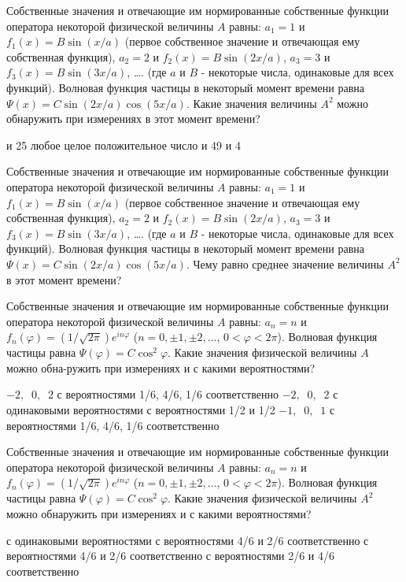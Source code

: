 \documentclass[11pt,a4paper]{exam}
\begin{document}
\begin{questions}
\question Собственные значения и отвечающие им нормированные собственные функции оператора некоторой физической величины $A$ равны: ${a_1} = 1$ и ${f_1}(x) = B\sin (x/a)$ (первое собственное значение и отвечающая ему собственная функция), ${a_2} = 2$ и ${f_2}(x) = B\sin (2x/a)$, ${a_3} = 3$ и ${f_3}(x) = B\sin (3x/a)$, …. (где $a$ и $B$ - некоторые числа, одинаковые для всех функций). Волновая функция частицы в некоторый момент времени равна $\Psi (x) = C\sin (2x/a)\cos (5x/a)$. Какие значения величины ${A^2}$ можно обнаружить при измерениях в этот момент времени?
\begin{choices}
 и 25    
\choice любое целое положительное число      
 и 49    
 и 4
\end{choices}

\question Собственные значения и отвечающие им нормированные собственные функции оператора некоторой физической величины $A$ равны: ${a_1} = 1$ и ${f_1}(x) = B\sin (x/a)$ (первое собственное значение и отвечающая ему собственная функция), ${a_2} = 2$ и ${f_2}(x) = B\sin (2x/a)$, ${a_3} = 3$ и${f_3}(x) = B\sin (3x/a)$, …. (где $a$ и $B$ - некоторые числа, одинаковые для всех функций). Волновая функция частицы в некоторый момент времени равна $\Psi (x) = C\sin (2x/a)\cos (5x/a)$. Чему равно среднее значение величины ${A^2}$ в этот момент времени?
\begin{choices}
\end{choices}

\question Собственные значения и отвечающие им нормированные собственные функции оператора некоторой физической величины $A$ равны: ${a_n} = n$ и ${f_n}(\varphi ) = \left( {1/\sqrt {2\pi } } \right){e^{in\varphi }}$ ($n = 0, \pm 1, \pm 2,...$, $0 < \varphi  < 2\pi $). Волновая функция частицы равна $\Psi (\varphi ) = C{\cos ^2}\varphi $. Какие значения физической величины $A$ можно обна-ружить при измерениях и с какими вероятностями? 
\begin{choices}
\choice $ - 2,\;\;0,\;\;2$ с вероятностями 1/6, 4/6, 1/6 соответственно
\choice $ - 2,\;\;0,\;\;2$ с одинаковыми вероятностями
\choice  с вероятностями 1/2 и 1/2
\choice $ - 1,\;\;0,\;\;1$ с вероятностями 1/6, 4/6, 1/6 соответственно
\end{choices}

\question Собственные значения и отвечающие им нормированные собственные функции оператора некоторой физической величины $A$ равны: ${a_n} = n$ и ${f_n}(\varphi ) = \left( {1/\sqrt {2\pi } } \right){e^{in\varphi }}$ ($n = 0, \pm 1, \pm 2,...$, $0 < \varphi  < 2\pi $). Волновая функция частицы равна $\Psi (\varphi ) = C{\cos ^2}\varphi $. Какие значения физической величины ${A^2}$ можно обнаружить при измерениях и с какими вероятностями? 
\begin{choices}
\choice  с одинаковыми вероятностями
\choice  с вероятностями 4/6 и 2/6 соответственно
\choice  с вероятностями 4/6 и 2/6 соответственно 
\choice  с вероятностями 2/6 и 4/6 соответственно
\end{choices}


\end{questions}
\end{document}
